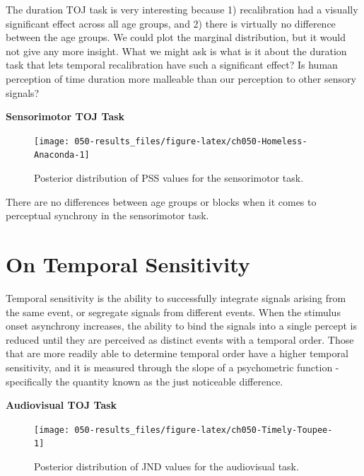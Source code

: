 \documentclass[11pt, oneside, openany]{scrbook}
\begin{document}
The duration TOJ task is very interesting because 1) recalibration had a visually significant effect across all age groups, and 2) there is virtually no difference between the age groups. We could plot the marginal distribution, but it would not give any more insight. What we might ask is what is it about the duration task that lets temporal recalibration have such a significant effect? Is human perception of time duration more malleable than our perception to other sensory signals?

\textbf{Sensorimotor TOJ Task}

\begin{figure}

{\centering \texttt{[image: 050-results\_files/figure-latex/ch050-Homeless-Anaconda-1]} 

}

\caption{Posterior distribution of PSS values for the sensorimotor task.}\label{fig:ch050-Homeless-Anaconda}
\end{figure}

There are no differences between age groups or blocks when it comes to perceptual synchrony in the sensorimotor task.

\hypertarget{on-temporal-sensitivity}{%
\section{On Temporal Sensitivity}\label{on-temporal-sensitivity}}

Temporal sensitivity is the ability to successfully integrate signals arising from the same event, or segregate signals from different events. When the stimulus onset asynchrony increases, the ability to bind the signals into a single percept is reduced until they are perceived as distinct events with a temporal order. Those that are more readily able to determine temporal order have a higher temporal sensitivity, and it is measured through the slope of a psychometric function - specifically the quantity known as the just noticeable difference.

\textbf{Audiovisual TOJ Task}

\begin{figure}

{\centering \texttt{[image: 050-results\_files/figure-latex/ch050-Timely-Toupee-1]} 

}

\caption{Posterior distribution of JND values for the audiovisual task.}\label{fig:ch050-Timely-Toupee}
\end{figure}
\end{document}
